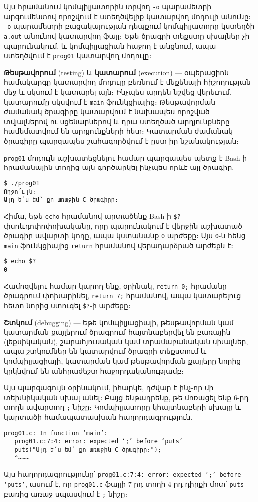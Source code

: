 Այս հրամանում կոմպիլյատորին տրվող \verb|-o| պարամետրի արգումենտով
որոշվում է ստեղծվելիք կատարվող մոդուլի անունը։ \verb|-o| պարամետրի
բացակայության դեպքում կոմպիլյատորը կստեղծի \verb|a.out| անունով
կատարվող ֆայլ։ Եթե ծրագրի տեքստը սխալներ չի պարունակում, և կոմպիլյացիան
հաջող է անցնում, ապա ստեղծվում է \verb|prog01| կատարվող մոդուլը։

\textbf{Թեսթավորում} (testing) և \textbf{կատարում} (execution) ---
օպերացիոն համակարգը կատարվող մոդուլը բեռնում է մեքենայի հիշողության
մեջ և սկսում է կատարել այն։ Ինչպես արդեն նշվեց վերեւում, կատարումը
սկսվում է \texttt{main} ֆունկցիայից։ Թեսթավորման ժամանակ ծրագիրը
կատարվում է նախապես որոշված տվյալներով ու սցենարներով և դրա ստեղծած
արդյունքները համեմատվում են արդյունքների հետ։ Կատարման ժամանակ ծրագիրը
պարզապես շահագործվում է ըստ իր նշանակության։

\texttt{prog01} մոդուլն աշխատեցնելու համար պարզապես պետք է Bash-ի
հրամանային տողից այն գործարկել ինչպես որևէ այլ ծրագիր.

\begin{Verbatim}
$ ./prog01
Ողջո՜ւյն։
Այդ ե՛ս եմ՝ քո առաջին C ծրագիրը։
\end{Verbatim}

Հիմա, եթե \texttt{echo} հրամանով արտածենք Bash-ի \verb|$?| փսոևդոփոփոխականը,
որը պարունակում է վերջին աշխատած ծրագիր ավարտի կոդը, ապա կստանանք \texttt{0}
արժեքը։ Այս \texttt{0}-ն հենց \texttt{main} ֆունկցիայից \texttt{return}
հրամանով վերադարձրած արժեքն է։

\begin{Verbatim}
$ echo $?
0
\end{Verbatim}

Համոզվելու համար կարող ենք, օրինակ, \texttt{return 0;} հրամանը ծրագրում
փոխարինել, \texttt{return 7;} հրամանով, ապա կատարելուց հետո նորից ստուգել
\verb|$?|-ի արժեքը։

\textbf{Շտկում} (debugging) --- եթե կոմպիլյացիայի, թեսթավորման կամ կատարման
քայլերում ծրագրում հայտնաբերվել են բառային (լեքսիկական), շարահյուսական կամ
տրամաբանական սխալներ,  ապա շտկումներ են կատարվում ծրագրի տեքստում և
կոմպիլյացիայի, կատարման կամ թեսթավորման քայլերը նորից կրկնվում են անհրաժեշտ
հաջորդականությամբ։

Այս պարզագույն օրինակում, իհարկե, դժվար է ինչ-որ մի տեխնիկական սխալ անել։
Բայց ենթադրենք, թե մոռացել ենք 6-րդ տողն ավարտող \verb|;| նիշը։ Կոմպիլյատորը
կհայտնաբերի սխալը և կարտածի համապատասխան հաղորդագրություն.

\begin{Verbatim}
prog01.c: In function ‘main’:
   prog01.c:7:4: error: expected ‘;’ before ‘puts’
   puts("Այդ ե՛ս եմ՝ քո առաջին C ծրագիրը։");
   ^~~~
\end{Verbatim}

Այս հաղորդագրությունը՝ \texttt{prog01.c:7:4: error: expected ‘;’ before
‘puts’}, ասում է, որ \texttt{prog01.c} ֆայլի 7-րդ տողի 4-րդ դիրքի մոտ՝
\texttt{puts} բառից առաջ սպասվում է \verb|;| նիշը։
